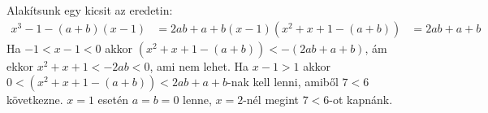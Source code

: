 Alakítsunk egy kicsit az eredetin:
\begin{align}
x^{3}-1-(a+b)(x-1) &= 2ab+a+b \label{asd}
(x-1)(x^{2}+x+1-(a+b)) &= 2ab+a+b
\end{align}
Ha $-1<x-1<0$ akkor $(x^{2}+x+1-(a+b))<-(2ab+a+b)$, 
ám ekkor $x^{2}+x+1<-2ab<0$, ami nem lehet. Ha $x-1>1$ akkor 
$0<(x^{2}+x+1-(a+b))< 2ab+a+b$-nak kell lenni, amiből $7<6$ következne.
$x=1$ esetén $a=b=0$ lenne, $x=2$-nél megint $7<6$-ot kapnánk.
